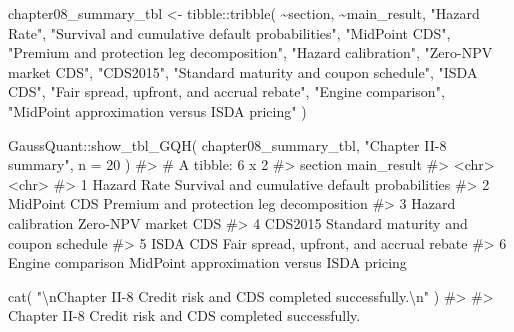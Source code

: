 \documentclass[
  letterpaper,
  DIV=11,
  numbers=noendperiod]{scrreprt}
\newenvironment{Shaded}{\begin{snugshade}}{\end{snugshade}}
\newcommand{\AttributeTok}[1]{\textcolor[rgb]{0.40,0.45,0.13}{#1}}
\newcommand{\CommentTok}[1]{\textcolor[rgb]{0.37,0.37,0.37}{#1}}
\newcommand{\DecValTok}[1]{\textcolor[rgb]{0.68,0.00,0.00}{#1}}
\newcommand{\FunctionTok}[1]{\textcolor[rgb]{0.28,0.35,0.67}{#1}}
\newcommand{\NormalTok}[1]{\textcolor[rgb]{0.00,0.23,0.31}{#1}}
\newcommand{\OtherTok}[1]{\textcolor[rgb]{0.00,0.23,0.31}{#1}}
\newcommand{\SpecialCharTok}[1]{\textcolor[rgb]{0.37,0.37,0.37}{#1}}
\newcommand{\StringTok}[1]{\textcolor[rgb]{0.13,0.47,0.30}{#1}}
\begin{document}
\begin{Shaded}
\begin{Highlighting}[]
\NormalTok{chapter08\_summary\_tbl }\OtherTok{\textless{}{-}}\NormalTok{ tibble}\SpecialCharTok{::}\FunctionTok{tribble}\NormalTok{(}
  \SpecialCharTok{\textasciitilde{}}\NormalTok{section,                     }\SpecialCharTok{\textasciitilde{}}\NormalTok{main\_result,}
  \StringTok{"Hazard Rate"}\NormalTok{,                }\StringTok{"Survival and cumulative default probabilities"}\NormalTok{,}
  \StringTok{"MidPoint CDS"}\NormalTok{,               }\StringTok{"Premium and protection leg decomposition"}\NormalTok{,}
  \StringTok{"Hazard calibration"}\NormalTok{,         }\StringTok{"Zero{-}NPV market CDS"}\NormalTok{,}
  \StringTok{"CDS2015"}\NormalTok{,                    }\StringTok{"Standard maturity and coupon schedule"}\NormalTok{,}
  \StringTok{"ISDA CDS"}\NormalTok{,                   }\StringTok{"Fair spread, upfront, and accrual rebate"}\NormalTok{,}
  \StringTok{"Engine comparison"}\NormalTok{,          }\StringTok{"MidPoint approximation versus ISDA pricing"}
\NormalTok{)}

\NormalTok{GaussQuant}\SpecialCharTok{::}\FunctionTok{show\_tbl\_GQH}\NormalTok{(}
\NormalTok{  chapter08\_summary\_tbl,}
  \StringTok{"Chapter II{-}8 summary"}\NormalTok{,}
  \AttributeTok{n =} \DecValTok{20}
\NormalTok{)}
\CommentTok{\#\textgreater{} \# A tibble: 6 x 2}
\CommentTok{\#\textgreater{}   section            main\_result                                  }
\CommentTok{\#\textgreater{}   \textless{}chr\textgreater{}              \textless{}chr\textgreater{}                                        }
\CommentTok{\#\textgreater{} 1 Hazard Rate        Survival and cumulative default probabilities}
\CommentTok{\#\textgreater{} 2 MidPoint CDS       Premium and protection leg decomposition     }
\CommentTok{\#\textgreater{} 3 Hazard calibration Zero{-}NPV market CDS                          }
\CommentTok{\#\textgreater{} 4 CDS2015            Standard maturity and coupon schedule        }
\CommentTok{\#\textgreater{} 5 ISDA CDS           Fair spread, upfront, and accrual rebate     }
\CommentTok{\#\textgreater{} 6 Engine comparison  MidPoint approximation versus ISDA pricing}

\FunctionTok{cat}\NormalTok{(}
  \StringTok{"}\SpecialCharTok{\textbackslash{}n}\StringTok{Chapter II{-}8 Credit risk and CDS completed successfully.}\SpecialCharTok{\textbackslash{}n}\StringTok{"}
\NormalTok{)}
\CommentTok{\#\textgreater{} }
\CommentTok{\#\textgreater{} Chapter II{-}8 Credit risk and CDS completed successfully.}
\end{Highlighting}
\end{Shaded}
\end{document}
